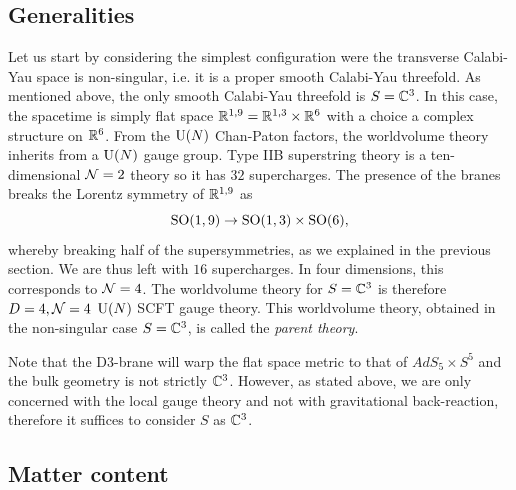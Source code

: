     \subsection{Generalities}

        Let us start by considering the simplest configuration were the transverse Calabi-Yau space is non-singular, i.e. it is a proper smooth Calabi-Yau threefold. As mentioned above, the only smooth Calabi-Yau threefold is $S=\mathbb{C}^3$. In this case, the spacetime is simply flat space $\mathbb{R}^{1,9}=\mathbb{R}^{1,3}\times\mathbb{R}^6$ with a choice a complex structure on $\mathbb{R}^6$. From the $\text{U}(N)$ Chan-Paton factors, the worldvolume theory inherits from a $\text{U}(N)$ gauge group. Type IIB superstring theory is a ten-dimensional $\mathcal{N}=2$ theory so it has $32$ supercharges. The presence of the branes breaks the Lorentz symmetry of $\mathbb{R}^{1,9}$ as
        \begin{equation}
            \text{SO}(1,9)\to\text{SO}(1,3)\times\text{SO}(6),
        \end{equation}
        whereby breaking half of the supersymmetries, as we explained in the previous section. We are thus left with $16$ supercharges. In four dimensions, this corresponds to $\mathcal{N}=4$. The worldvolume theory for $S=\mathbb{C}^3$ is therefore $D=4,\mathcal{N}=4$ $\text{U}(N)$ SCFT gauge theory. This worldvolume theory, obtained in the non-singular case $S=\mathbb{C}^3$, is called the \emph{parent theory}.

        Note that the D$3$-brane will warp the flat space metric to that of $AdS_5\times S^5$ and the bulk geometry is not strictly $\mathbb{C}^3$. However, as stated above, we are only concerned with the local gauge theory and not with gravitational back-reaction, therefore it suffices to consider $S$ as $\mathbb{C}^3$.

    \subsection{Matter content}

